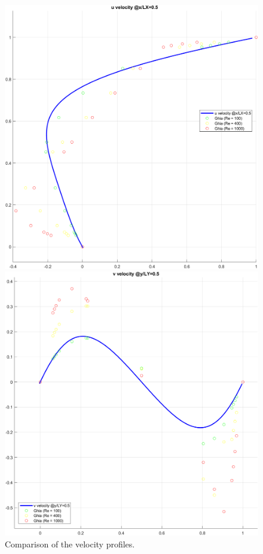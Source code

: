 \begin{figure}[H]
    \begin{minipage}[b]{0.45\textwidth}
        \centering
        \includegraphics[width=.9\textwidth]{./img/velocity_profiles_Re1000_u}
        \caption{$u(y) @ x/L_x = 0.5$}
        \label{fig:velocity_profiles_Re1000_u}
    \end{minipage}
    \hfill
    \begin{minipage}[b]{0.45\textwidth}
        \centering
        \includegraphics[width=.9\textwidth]{./img/velocity_profiles_Re1000_v}
        \caption{$v(x) @ y/L_y = 0.5$}
        \label{fig:velocity_profiles_Re1000_v}
    \end{minipage}
    \caption{Comparison of the velocity profiles.}
    \label{fig:velocity_profiles_Re1000_comparison}
\end{figure}

